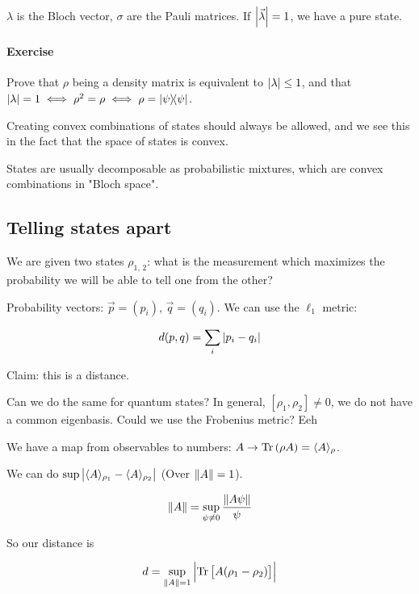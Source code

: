 $\lambda$ is the Bloch vector, $\sigma$ are the Pauli matrices.
If $\abs{\vec{\lambda}} = 1$, we have a pure state.

\paragraph{Exercise}
Prove that \(\rho\) being a density matrix is equivalent to $\abs{\lambda}\leq 1$, and that $\abs{\lambda} = 1 \iff \rho^2 = \rho \iff \rho = \ketbra{\psi}$.

Creating convex combinations of states should always be allowed,  and we see this in the fact that the space of states is convex.

States are usually decomposable as probabilistic mixtures, which are convex combinations in "Bloch space".

\subsection{Telling states apart} We are given two states \(\rho _{1, \, 2}\): what is the measurement which maximizes the probability we will be able to tell one from the other?

Probability vectors: \(\vec{p} = (p_i)\), \(\vec{q} = (q_i)\). We can use the \(\ell_1\) metric:

\begin{equation}
  d(p, q) = \sum_i \abs{p_i - q_i}
\end{equation}

Claim: this is a distance.

Can we do the same for quantum states? In general, \([\rho_1,  \rho_2] \neq 0\), we do not have a common eigenbasis. Could we use the Frobenius metric? Eeh

We have a map from observables to numbers: \(A \rightarrow \Tr \qty(\rho A) = \langle A \rangle_\rho\).

We can do \(\sup{\abs{{\langle A \rangle_{\rho_1} - \langle A \rangle_{\rho_2}}}}\) (Over \(\norm{A} = 1\)).

\begin{equation}
  \norm{A} = \sup_{\psi \neq 0} \frac{\norm{A\psi}}{\psi}
\end{equation}


So our distance is

\begin{equation}
  d = \sup_{\norm{A}=1} \abs{\Tr \qty[A(\rho_1 - \rho_2)]}
\end{equation}

